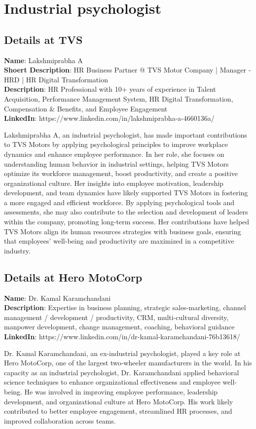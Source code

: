 \section{Industrial psychologist}
\subsection{Details at TVS}

\textbf{Name}: Lakshmiprabha A\\
\textbf{Shoert Description}: HR Business Partner @ TVS Motor Company | Manager - HRD | HR Digital Transformation\\
\textbf{Description}:  HR Professional with 10+ years of experience in Talent Acquisition, Performance Management System, HR Digital Transformation, Compensation \& Benefits, and Employee Engagement\\
\textbf{LinkedIn}: https://www.linkedin.com/in/lakshmiprabha-a-4660136a/

Lakshmiprabha A, an industrial psychologist, has made important contributions to TVS Motors by applying psychological principles to improve workplace dynamics and enhance employee performance. In her role, she focuses on understanding human behavior in industrial settings, helping TVS Motors optimize its workforce management, boost productivity, and create a positive organizational culture. Her insights into employee motivation, leadership development, and team dynamics have likely supported TVS Motors in fostering a more engaged and efficient workforce. By applying psychological tools and assessments, she may also contribute to the selection and development of leaders within the company, promoting long-term success.
Her contributions have helped TVS Motors align its human resources strategies with business goals, ensuring that employees' well-being and productivity are maximized in a competitive industry.

\subsection{Details at Hero MotoCorp}

\textbf{Name}: Dr. Kamal Karamchandani\\
\textbf{Description}: Expertise in business planning, strategic sales-marketing, channel management / development / productivity, CRM, multi-cultural diversity, manpower development, change management, coaching, behavioral guidance\\
\textbf{LinkedIn}: https://www.linkedin.com/in/dr-kamal-karamchandani-76b13618/

Dr. Kamal Karamchandani, an ex-industrial psychologist, played a key role at Hero MotoCorp, one of the largest two-wheeler manufacturers in the world. In his capacity as an industrial psychologist, Dr. Karamchandani applied behavioral science techniques to enhance organizational effectiveness and employee well-being. He was involved in improving employee performance, leadership development, and organizational culture at Hero MotoCorp. His work likely contributed to better employee engagement, streamlined HR processes, and improved collaboration across teams.